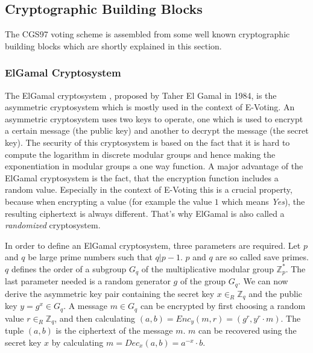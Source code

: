 \documentclass[numbers=noenddot, abstract=on, a4paper, headsepline,
footsepline, oneside, draft=off]{scrreprt}
\begin{document}
\subsection{Cryptographic Building Blocks}
\label{sec:buildingblocks}
The CGS97 voting scheme is assembled from some well known cryptographic building
blocks which are shortly explained in this section.

\subsubsection{ElGamal Cryptosystem}
\label{sec:elgamal}
The ElGamal cryptosystem \cite{EG84}, proposed by Taher El Gamal in 1984, is the
asymmetric cryptosystem which is mostly used in the context of E-Voting. An
asymmetric cryptosystem uses two keys to operate, one which is used to encrypt a
certain message (the public key) and another to decrypt the message (the secret
key). The security of this cryptosystem is based on the fact that it is hard to
compute the logarithm in discrete modular groups and hence making the
exponentiation in modular groups a one way function. A major advantage of the
ElGamal cryptosystem is the fact, that the encryption function includes a random
value. Especially in the context of E-Voting this is a crucial property, because
when encrypting a value (for example the value $1$ which means \textit{Yes}),
the resulting ciphertext is always different. That's why ElGamal is also called
a \textit{randomized} cryptosystem.

In order to define an ElGamal cryptosystem, three parameters are required. Let
$p$ and $q$ be large prime numbers such that $q|p-1$. $p$ and $q$ are so called
save primes. $q$ defines the order of a subgroup $G_q$ of the multiplicative
modular group $\mathbb{Z}^*_p$. The last parameter needed is a random generator
$g$ of the group $G_q$. We can now derive the asymmetric key pair containing the
secret key $x \in_R \mathbb{Z}_q$ and the public key $y=g^x \in G_q$. A message
$m \in G_q$ can be encrypted by first choosing a random value $r \in_R
\mathbb{Z}_q$, and then calculating $(a, b)=Enc_y(m, r)=(g^r, y^r \cdot m)$. The
tuple $(a, b)$ is the ciphertext of the message $m$. $m$ can be recovered using
the secret key $x$ by calculating $m=Dec_x(a, b)=a^{-x} \cdot b$.
\end{document}
